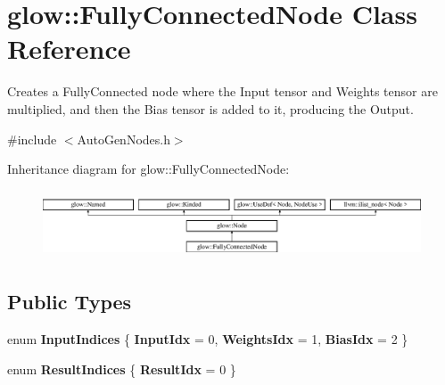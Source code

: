\hypertarget{classglow_1_1_fully_connected_node}{}\section{glow\+:\+:Fully\+Connected\+Node Class Reference}
\label{classglow_1_1_fully_connected_node}


Creates a Fully\+Connected node where the Input tensor and Weights tensor are multiplied, and then the Bias tensor is added to it, producing the Output.  




{\ttfamily \#include $<$Auto\+Gen\+Nodes.\+h$>$}

Inheritance diagram for glow\+:\+:Fully\+Connected\+Node\+:\begin{figure}[H]
\begin{center}
\leavevmode
\includegraphics[height=2.028986cm]{classglow_1_1_fully_connected_node}
\end{center}
\end{figure}
\subsection*{Public Types}
\begin{DoxyCompactItemize}
\item 
\mbox{\label{classglow_1_1_fully_connected_node_a974b47da624577f30a43f17cf887d855}} 
enum {\bfseries Input\+Indices} \{ {\bfseries Input\+Idx} = 0, 
{\bfseries Weights\+Idx} = 1, 
{\bfseries Bias\+Idx} = 2
 \}
\item 
\mbox{\label{classglow_1_1_fully_connected_node_af4d98fefca7b8ac0f01a558df4050958}} 
enum {\bfseries Result\+Indices} \{ {\bfseries Result\+Idx} = 0
 \}
\end{DoxyCompactItemize}
